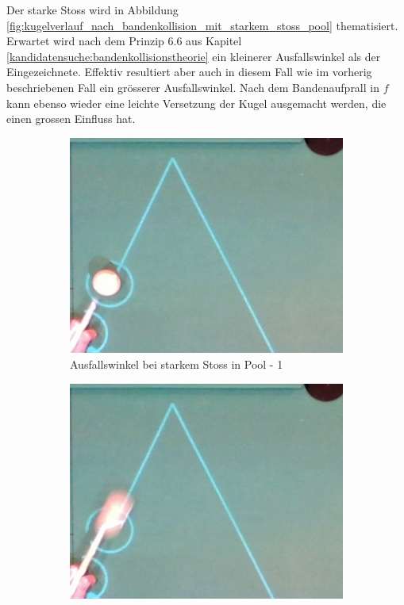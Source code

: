 Der starke Stoss wird in Abbildung \ref{fig:kugelverlauf_nach_bandenkollision_mit_starkem_stoss_pool} thematisiert.
Erwartet wird nach dem Prinzip 6.6 aus Kapitel \ref{kandidatensuche:bandenkollisionstheorie} ein kleinerer Ausfallswinkel als der Eingezeichnete.
Effektiv resultiert aber auch in diesem Fall wie im vorherig beschriebenen Fall ein grösserer Ausfallswinkel.
Nach dem Bandenaufprall in $f$ kann ebenso wieder eine leichte Versetzung der Kugel ausgemacht werden, die einen
grossen Einfluss hat.

\begin{figure}[h!]
    \centering
    \begin{subfigure}[b]{0.2\textwidth}
        \centering
        \includegraphics[width=1.0\linewidth]{../common/04_results/resources/simulation/rebound_angle_fast_pool/00_rail_rebound_angle_fast_pool_01.png}
        \caption{Ausfallswinkel bei starkem Stoss in Pool - 1}
        \label{fig:rebound_angle_fast_pool_1}
    \end{subfigure}
    \hfill
    \begin{subfigure}[b]{0.2\textwidth}
        \centering
        \includegraphics[width=1.0\linewidth]{../common/04_results/resources/simulation/rebound_angle_fast_pool/00_rail_rebound_angle_fast_pool_02.png}

\end{subfigure}
\end{figure}
